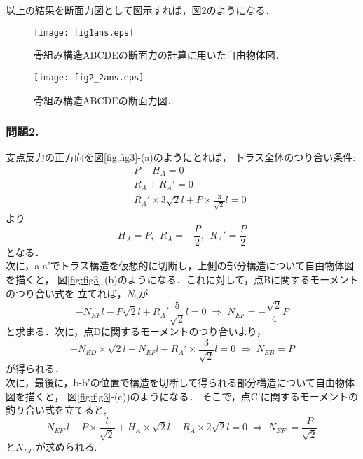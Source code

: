 \documentclass[10pt,a4j]{jarticle}
\begin{document}
以上の結果を断面力図として図示すれば，図\ref{fig:fig2}のようになる．
\begin{figure}[h]
	\begin{center}
	\texttt{[image: fig1ans.eps]} 
	\end{center}
	\caption{骨組み構造ABCDEの断面力の計算に用いた自由物体図．} 
	\label{fig:fig1}
\end{figure}
\begin{figure}[h]
	\begin{center}
	\texttt{[image: fig2\_2ans.eps]} 
	\end{center}
	\caption{骨組み構造ABCDEの断面力図．} 
	\label{fig:fig2}
\end{figure}
\subsubsection*{問題2.}
支点反力の正方向を図\ref{fig:fig3}-(a)のようにとれば，
トラス全体のつり合い条件:
\begin{eqnarray}
	&& P-H_A=0  \\
	&& R_A+R_A'=0 \\  
	&& R_A'\times 3\sqrt{2}l + P \times \frac{3}{\sqrt{2}}l=0 
\end{eqnarray}
より
\begin{equation}
	H_A=P, \ \ 
	R_A=-\frac{P}{2}, \ \ 
	R_A'=\frac{P}{2}
\end{equation}
となる．\\

次に，a-a'でトラス構造を仮想的に切断し，上側の部分構造について自由物体図を描くと，
図\ref{fig:fig3}-(b)のようになる．これに対して，点Bに関するモーメントのつり合い式を
立てれば，$N_5$が
\begin{equation}
	-N_{EF}l-P\sqrt{2}l + R_A'\frac{5}{\sqrt{2}}l =0
	\; \Rightarrow \;
	N_{EF}=-\frac{\sqrt{2}}{4}P
\end{equation}
と求まる．次に，点Dに関するモーメントのつり合いより，
\begin{equation}
	-N_{ED}\times \sqrt{2}l -N_{EF}l +R_A'\times \frac{3}{\sqrt{2}}l=0
	\; \Rightarrow \;
	N_{EB}=P
\end{equation}
が得られる．\\

次に，最後に，b-b'の位置で構造を切断して得られる部分構造について自由物体図を描くと，
図\ref{fig:fig3}-(c))のようになる．
そこで，点C'に関するモーメントの釣り合い式を立てると,
\begin{equation}
	N_{EF'}l-P\times \frac{l}{\sqrt{2}}+H_A\times \sqrt{2}l-R_A\times 2\sqrt{2}l =0 \;
	\Rightarrow \; 
	N_{EF'}=\frac{P}{\sqrt{2}}
\end{equation}
と$N_{EF'}$が求められる.
\end{document}
